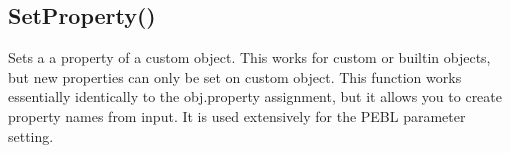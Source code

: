 \documentclass[letterpaper,10pt,english]{sphinxmanual}
\begin{document}
\sphinxAtStartPar
{}

\begin{sphinxVerbatim}[commandchars=\\\{\}]
\end{sphinxVerbatim}

\sphinxAtStartPar
{}

\begin{sphinxVerbatim}[commandchars=\\\{\}]
\end{sphinxVerbatim}

\sphinxAtStartPar
{}

\sphinxAtStartPar
{}

\ignorespaces 

\subsection{SetProperty()}
\label{\detokenize{reference/peblobjects:setproperty}}\label{\detokenize{reference/peblobjects:index-52}}
\sphinxAtStartPar
{}

\sphinxAtStartPar
{}

\sphinxAtStartPar
Sets a a property of a custom object.   This works for custom or built\sphinxhyphen{}in objects, but new properties can only be set on custom object. This function works essentially identically to the obj.property assignment, but it allows you to create property names from input. It is used extensively for the PEBL parameter setting.
\end{document}
